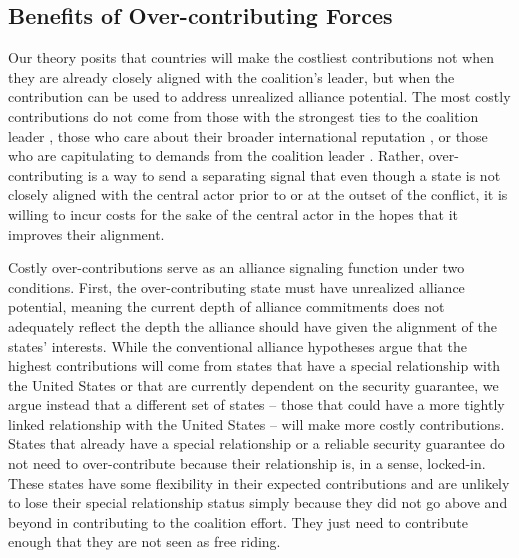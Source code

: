 \documentclass[12pt,letterpaper]{article}
\begin{document}
	\subsection{Benefits of Over-contributing Forces}
		Our theory posits that countries will make the costliest contributions not when they are already closely aligned with the coalition's leader, but when the contribution can be used to address unrealized alliance potential. The most costly contributions do not come from those with the strongest ties to the coalition leader \citep{ringsmose_natoburdensharingredux_2010, wolford_showing_2014}, those who care about their broader international reputation \citep{pedersen_bandwagonstatuschanging_2018}, or those who are capitulating to demands from the coalition leader \citep{schweller_newrealistresearch_1997}. Rather, over-contributing is a way to send a separating signal that even though a state is not closely aligned with the central actor prior to or at the outset of the conflict, it is willing to incur costs for the sake of the central actor in the hopes that it improves their alignment.

		Costly over-contributions serve as an alliance signaling function under two conditions. First, the over-contributing state must have unrealized alliance potential, meaning the current depth of alliance commitments does not adequately reflect the depth the alliance should have given the alignment of the states' interests. While the conventional alliance hypotheses argue that the highest contributions will come from states that have a special relationship with the United States or that are currently dependent on the security guarantee, we argue instead that a different set of states -- those that could have a more tightly linked relationship with the United States -- will make more costly contributions. States that already have a special relationship or a reliable security guarantee do not need to over-contribute because their relationship is, in a sense, locked-in. These states have some flexibility in their expected contributions and are unlikely to lose their special relationship status simply because they did not go above and beyond in contributing to the coalition effort. They just need to contribute enough that they are not seen as free riding. 
\end{document}

